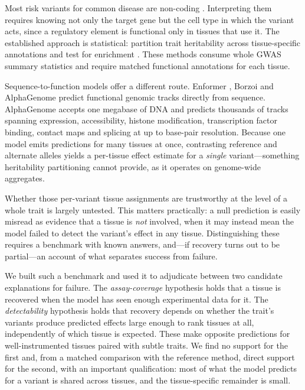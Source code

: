 \documentclass[11pt]{article}
\begin{document}
Most risk variants for common disease are non-coding \citep{maurano2012regulatory, finucane2015partitioning}.
Interpreting them requires knowing not only the target gene but the cell type in which
the variant acts, since a regulatory element is functional only in tissues that use it.
The established approach is statistical: partition trait heritability across
tissue-specific annotations and test for enrichment
\citep{finucane2015partitioning, finucane2018seg}. These methods consume whole GWAS
summary statistics and require matched functional annotations for each tissue.

Sequence-to-function models offer a different route. Enformer
\citep{avsec2021enformer}, Borzoi \citep{linder2025borzoi} and AlphaGenome
\citep{avsec2026alphagenome} predict functional genomic tracks directly from sequence.
AlphaGenome accepts one megabase of DNA and predicts thousands of tracks spanning
expression, accessibility, histone modification, transcription factor binding, contact
maps and splicing at up to base-pair resolution. Because one model emits predictions for
many tissues at once, contrasting reference and alternate alleles yields a per-tissue
effect estimate for a \emph{single} variant---something heritability partitioning
cannot provide, as it operates on genome-wide aggregates.

Whether those per-variant tissue assignments are trustworthy at the level of a whole
trait is largely untested. This matters practically: a null prediction is easily
misread as evidence that a tissue is \emph{not} involved, when it may instead mean the
model failed to detect the variant's effect in any tissue. Distinguishing these
requires a benchmark with known answers, and---if recovery turns out to be partial---an
account of what separates success from failure.

We built such a benchmark and used it to adjudicate between two candidate explanations
for failure. The \emph{assay-coverage} hypothesis holds that a tissue is recovered when
the model has seen enough experimental data for it. The \emph{detectability} hypothesis
holds that recovery depends on whether the trait's variants produce predicted effects
large enough to rank tissues at all, independently of which tissue is expected. These
make opposite predictions for well-instrumented tissues paired with subtle traits. We find no
support for the first and, from a matched comparison with the reference method, direct
support for the second, with an important qualification: most of what the model predicts
for a variant is shared across tissues, and the tissue-specific remainder is small.
\end{document}
